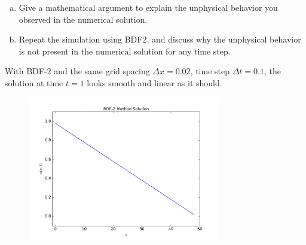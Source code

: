 \documentclass[12pt]{article}
\begin{document}
\begin{enumerate}[(a)]
\item Give a mathematical argument to explain the unphysical behavior you observed in the numerical solution.

\item Repeat the simulation using BDF2, and discuss why the unphysical behavior is not present in the numerical solution for any time step.
\end{enumerate}

With BDF-2 and the same grid spacing $\Delta x = 0.02$, time step $\Delta t = 0.1$, the solution at time $t=1$ looks smooth and linear as it should.

\begin{figure}[H]
\centering\includegraphics[width=0.75\textwidth]{problem3_bdf2_fixedissue.png}
\end{figure}
\end{document}
